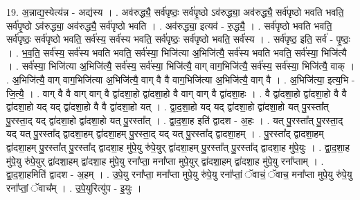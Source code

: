 \documentclass[17pt]{extarticle}
\begin{document}
19. अ॒न्नाद्य॒स्येत्य॑न्न - अद्य॑स्य । . अव॑रुद्ध्यै॒ सर्व॑पृष्ठः॒ सर्व॑पृ॒ष्ठो ऽव॑रुद्ध्या॒ अव॑रुद्ध्यै॒ सर्व॑पृष्ठो भवति भवति॒ सर्व॑पृ॒ष्ठो ऽव॑रुद्ध्या॒ अव॑रुद्ध्यै॒ सर्व॑पृष्ठो भवति । . अव॑रुद्ध्या॒ इत्यव॑ - रु॒द्ध्यै॒ । . सर्व॑पृष्ठो भवति भवति॒ सर्व॑पृष्ठः॒ सर्व॑पृष्ठो भवति॒ सर्व॑स्य॒ सर्व॑स्य भवति॒ सर्व॑पृष्ठः॒ सर्व॑पृष्ठो भवति॒ सर्व॑स्य । . सर्व॑पृष्ठ॒ इति॒ सर्व॑ - पृ॒ष्ठः॒ । . भ॒व॒ति॒ सर्व॑स्य॒ सर्व॑स्य भवति भवति॒ सर्व॑स्या॒ भिजि॑त्या अ॒भिजि॑त्यै॒ सर्व॑स्य भवति भवति॒ सर्व॑स्या॒ भिजि॑त्यै । . सर्व॑स्या॒ भिजि॑त्या अ॒भिजि॑त्यै॒ सर्व॑स्य॒ सर्व॑स्या॒ भिजि॑त्यै॒ वाग् वाग॒भिजि॑त्यै॒ सर्व॑स्य॒ सर्व॑स्या॒ भिजि॑त्यै॒ वाक् । . अ॒भिजि॑त्यै॒ वाग् वाग॒भिजि॑त्या अ॒भिजि॑त्यै॒ वाग् वै वै वाग॒भिजि॑त्या अ॒भिजि॑त्यै॒ वाग् वै । . अ॒भिजि॑त्या॒ इत्य॒भि - जि॒त्यै॒ । . वाग् वै वै वाग् वाग् वै द्वा॑दशा॒हो द्वा॑दशा॒हो वै वाग् वाग् वै द्वा॑दशा॒हः । . वै द्वा॑दशा॒हो द्वा॑दशा॒हो वै वै द्वा॑दशा॒हो यद् यद् द्वा॑दशा॒हो वै वै द्वा॑दशा॒हो यत् । . द्वा॒द॒शा॒हो यद् यद् द्वा॑दशा॒हो द्वा॑दशा॒हो यत् पु॒रस्ता᳚त् पु॒रस्ता॒द् यद् द्वा॑दशा॒हो द्वा॑दशा॒हो यत् पु॒रस्ता᳚त् । . द्वा॒द॒शा॒ह इति॑ द्वादश - अ॒हः । . यत् पु॒रस्ता᳚त् पु॒रस्ता॒द् यद् यत् पु॒रस्ता᳚द् द्वादशा॒हम् द्वा॑दशा॒हम् पु॒रस्ता॒द् यद् यत् पु॒रस्ता᳚द् द्वादशा॒हम् । . पु॒रस्ता᳚द् द्वादशा॒हम् द्वा॑दशा॒हम् पु॒रस्ता᳚त् पु॒रस्ता᳚द् द्वादशा॒ह मु॑पे॒यु रु॑पे॒युर् द्वा॑दशा॒हम् पु॒रस्ता᳚त् पु॒रस्ता᳚द् द्वादशा॒ह मु॑पे॒युः । . द्वा॒द॒शा॒ह मु॑पे॒यु रु॑पे॒युर् द्वा॑दशा॒हम् द्वा॑दशा॒ह मु॑पे॒यु रना᳚प्ता॒ मना᳚प्ता मुपे॒युर् द्वा॑दशा॒हम् द्वा॑दशा॒ह मु॑पे॒यु रना᳚प्ताम् । . द्वा॒द॒शा॒हमिति॑ द्वादश - अ॒हम् । . उ॒पे॒यु रना᳚प्ता॒ मना᳚प्ता मुपे॒यु रु॑पे॒यु रना᳚प्तां॒ ॅवाचं॒ ॅवाच॒ मना᳚प्ता मुपे॒यु रु॑पे॒यु रना᳚प्तां॒ ॅवाच᳚म् । . उ॒पे॒युरित्यु॑प - इ॒युः । \newline
\end{document}
